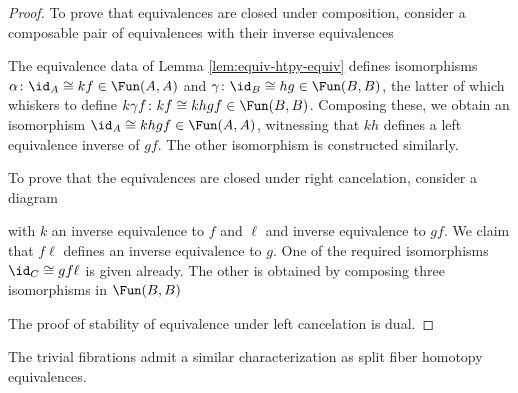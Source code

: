 \begin{proof}
 To prove that equivalences are closed under composition, consider a composable pair of equivalences with their inverse equivalences
\begin{center}
\end{center}
The equivalence data of Lemma \ref{lem:equiv-htpy-equiv} defines isomorphisms $\alpha\colon \id_A \cong kf \in \Fun(A,A)$ and $\gamma \colon \id_B \cong hg \in \Fun(B,B)$, the latter of which whiskers to define $k\gamma f \colon kf \cong khgf \in \Fun(B,B)$. Composing these, we obtain an isomorphism $\id_A \cong khgf \in \Fun(A,A)$, witnessing that $kh$ defines a left equivalence inverse of $gf$. The other isomorphism is constructed similarly.

To prove that the equivalences are closed under right cancelation,  consider a diagram
\begin{center}
\end{center}
with $k$ an inverse equivalence to $f$ and $\ell$ and inverse equivalence to $gf$. We claim that $f\ell$ defines an inverse equivalence to $g$. One of the required isomorphisms $\id_C \cong gf\ell$ is given already. The other is obtained by composing three isomorphisms in $\Fun(B,B)$
\begin{center} \end{center}
The proof of stability of equivalence under left cancelation is dual.
\end{proof}


The trivial fibrations admit a similar characterization as split fiber homotopy equivalences.

